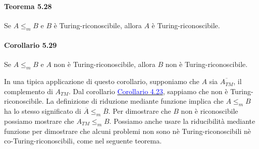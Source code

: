 \documentclass{article}
\begin{document}
\paragraph{Teorema 5.28}
\label{teorema-5.28}
\text{}
\newline
\begin{tcolorbox}[title=Teorema 5.28]
    Se $A \leq_m B$ e $B$ è Turing-riconoscibile, allora $A$ è Turing-riconoscibile.
\end{tcolorbox}
\vspace{1em}
\text{}
\newline
\paragraph*{Corollario 5.29}
\label{corollario-5.29}
\text{}
\newline
\begin{tcolorbox}[title=Corollario 5.29]
    Se $A \leq_m B$ e $A$ non è Turing-riconoscibile, allora $B$ non è Turing-riconoscibile.
\end{tcolorbox}
In una tipica applicazione di questo corollario, supponiamo che $A$ sia $\overline{A_{TM}}$, il complemento di $A_{TM}$.
Dal corollario \hyperref[corollario-4.23]{\textcolor{blue}{Corollario 4.23}}, sappiamo che non è Turing-riconoscibile.
La definizione di riduzione mediante funzione implica che $A \leq_m B$ ha lo stesso significato di $\overline{A} \leq_m \overline{B}$.
Per dimostrare che $B$ non è riconoscibile possiamo mostrare che $A_{TM} \leq_m B$.
Possiamo anche usare la riducibilità mediante funzione per dimostrare che alcuni problemi non sono nè Turing-riconoscibili nè co-Turing-riconoscibili, come nel seguente teorema.
\vspace{1em}
\text{}
\newline
\end{document}
